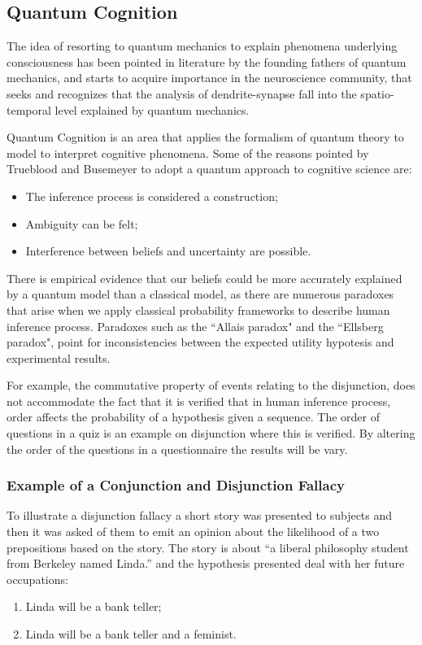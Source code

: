 

\subsection{Quantum Cognition}
\label{subsec:QuantumCog}

The idea of resorting to quantum mechanics to explain phenomena underlying consciousness has been pointed in literature by the founding fathers of quantum mechanics, and starts to acquire importance in the neuroscience community, that seeks and recognizes that the analysis of dendrite-synapse fall into the spatio-temporal level explained by quantum mechanics\cite{Tarlaci2010}. 

Quantum Cognition is an area that applies the formalism of quantum theory to model to interpret cognitive phenomena. 
Some of the reasons pointed by Trueblood and Busemeyer\cite{Trueblood}\cite{Busemeyer:2012:QMC:2385442} to adopt a quantum approach to cognitive science are:
\begin{itemize}
\item The inference process is considered a construction; 
\item Ambiguity can be felt;
\item Interference between beliefs and uncertainty are possible. 
\end{itemize}

There is empirical evidence that our beliefs could be more accurately explained by a quantum model than a classical model, as there are numerous paradoxes that arise when we apply classical probability frameworks to describe human inference process\cite[Busemeyer et al]{Busemeyer2009}. 
Paradoxes such as the ``Allais paradox" and the ``Ellsberg paradox", point for inconsistencies between the expected utility hypotesis and experimental results\cite{Aerts2011}.

For example, the commutative property of events relating to the disjunction, does not accommodate the fact that it is verified\cite{TruebloodJ} that in human inference process, order affects the probability of a hypothesis given a sequence. The order of questions in a quiz is an example on disjunction where this is verified. By altering the order of the questions  in a questionnaire the results will be vary. \cite{Trueblood}

\subsubsection{Example of a Conjunction and Disjunction Fallacy}
To illustrate a disjunction fallacy \cite[Busemeyer et al]{Busemeyer2009} a short story was presented to subjects and then it was asked of them to emit an opinion about the likelihood of a two prepositions based on the story.
The story is about ``a liberal philosophy student from Berkeley named Linda.'' and the hypothesis presented deal with her future occupations:
\begin{enumerate}
\item Linda will be a bank teller;
\item Linda will be a bank teller and a feminist.
\end{enumerate} 

